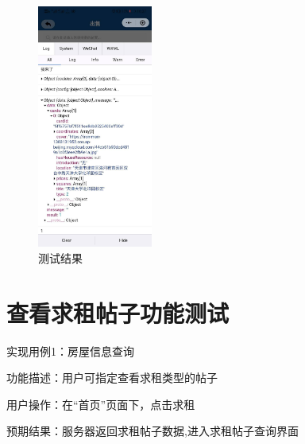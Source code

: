\begin{figure}[htbp]
\begin{minipage}[t]{0.32\textwidth}
    \end{minipage}
    \begin{minipage}[t]{0.32\textwidth}
    \centering
    \includegraphics[width=3.8cm,height=8cm]{test/image/test12.png}
    \caption{测试结果}
    \end{minipage}
    \end{figure}
 
\section{查看求租帖子功能测试}
实现用例1：房屋信息查询

功能描述：用户可指定查看求租类型的帖子

用户操作：在“首页”页面下，点击求租

预期结果：服务器返回求租帖子数据,进入求租帖子查询界面

